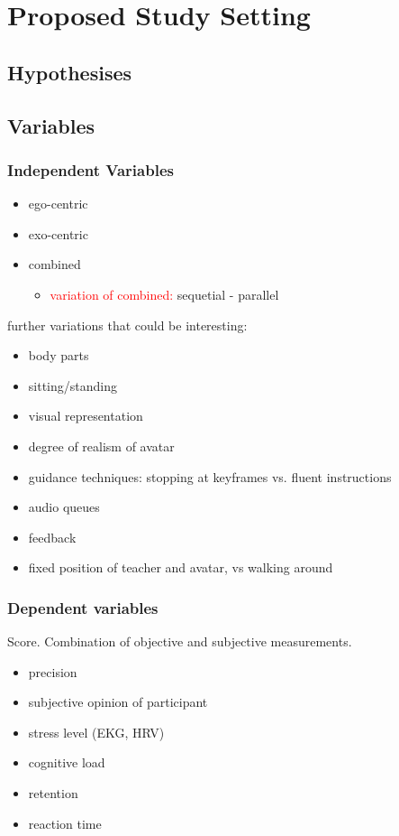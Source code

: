 \chapter{Proposed Study Setting}

\section{Hypothesises}
\section{Variables}
\subsection{Independent Variables}
\begin{itemize}
	\item ego-centric
	\item exo-centric
	\item combined
	\begin{itemize}
		\item \textcolor{red}{variation of combined:} sequetial - parallel
	\end{itemize}
\end{itemize}
 further variations that could be interesting:
 \begin{itemize}
	\item body parts
	\item sitting/standing
	\item visual representation
	\item degree of realism of avatar
	\item guidance techniques: stopping at keyframes vs. fluent instructions
	\item audio queues
	\item feedback
	\item fixed position of teacher and avatar, vs walking around
\end{itemize}
\subsection{Dependent variables}
Score. Combination of objective and subjective measurements.
\begin{itemize}
	\item precision
	\item subjective opinion of participant
	\item stress level (EKG, HRV)
	\item cognitive load
	\item retention
	\item reaction time
\end{itemize}
